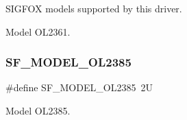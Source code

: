 S\+I\+G\+F\+OX models supported by this driver. 

Model O\+L2361. \mbox{\label{group__models__group_gaa52e2341e453e43e6d60100c5dcca68f}} 
\subsubsection{\texorpdfstring{SF\_MODEL\_OL2385}{SF\_MODEL\_OL2385}}
{\footnotesize\ttfamily \#define S\+F\+\_\+\+M\+O\+D\+E\+L\+\_\+\+O\+L2385~2U}

Model O\+L2385. 